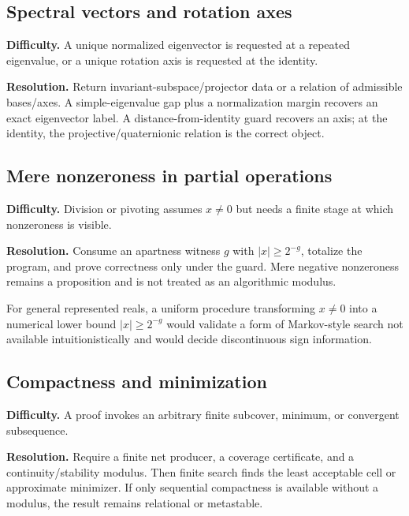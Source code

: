 \subsection{Spectral vectors and rotation axes}

\textbf{Difficulty.}  A unique normalized eigenvector is requested at a repeated eigenvalue, or a unique rotation axis is requested at the identity.

\textbf{Resolution.}  Return invariant-subspace/projector data or a relation of admissible bases/axes.  A simple-eigenvalue gap plus a normalization margin recovers an exact eigenvector label.  A distance-from-identity guard recovers an axis; at the identity, the projective/quaternionic relation is the correct object.

\subsection{Mere nonzeroness in partial operations}

\textbf{Difficulty.}  Division or pivoting assumes \(x\ne0\) but needs a finite stage at which nonzeroness is visible.

\textbf{Resolution.}  Consume an apartness witness \(g\) with \(|x|\ge2^{-g}\), totalize the program, and prove correctness only under the guard.  Mere negative nonzeroness remains a proposition and is not treated as an algorithmic modulus.

\begin{barrier}
For general represented reals, a uniform procedure transforming \(x\ne0\) into a numerical lower bound \(|x|\ge2^{-g}\) would validate a form of Markov-style search not available intuitionistically and would decide discontinuous sign information.
\end{barrier}

\subsection{Compactness and minimization}

\textbf{Difficulty.}  A proof invokes an arbitrary finite subcover, minimum, or convergent subsequence.

\textbf{Resolution.}  Require a finite net producer, a coverage certificate, and a continuity/stability modulus.  Then finite search finds the least acceptable cell or approximate minimizer.  If only sequential compactness is available without a modulus, the result remains relational or metastable.

